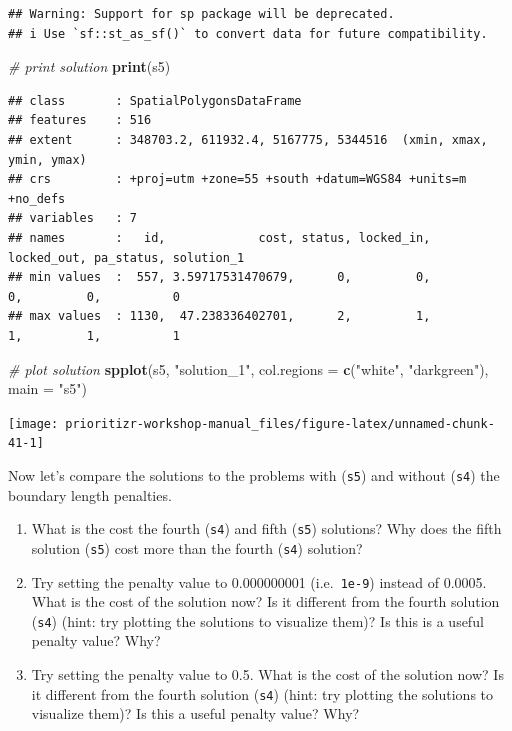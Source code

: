 \documentclass[12pt,]{book}
\makeatletter
\newenvironment{Shaded}{\begin{snugshade}}{\end{snugshade}}
\newcommand{\CommentTok}[1]{\textcolor[rgb]{0.56,0.35,0.01}{\textit{#1}}}
\newcommand{\DataTypeTok}[1]{\textcolor[rgb]{0.13,0.29,0.53}{#1}}
\newcommand{\KeywordTok}[1]{\textcolor[rgb]{0.13,0.29,0.53}{\textbf{#1}}}
\newcommand{\NormalTok}[1]{#1}
\newcommand{\StringTok}[1]{\textcolor[rgb]{0.31,0.60,0.02}{#1}}
\providecommand{\tightlist}{%
  \setlength{\itemsep}{0pt}\setlength{\parskip}{0pt}}
\newenvironment{kframe}{%
\medskip{}
\setlength{\fboxsep}{.8em}
 \def\at@end@of@kframe{}%
 \ifinner\ifhmode%
  \def\at@end@of@kframe{\end{minipage}}%
  \begin{minipage}{\columnwidth}%
 \fi\fi%
 \def\FrameCommand##1{\hskip\@totalleftmargin \hskip-\fboxsep
 \colorbox{shadecolor}{##1}\hskip-\fboxsep
     \hskip-\linewidth \hskip-\@totalleftmargin \hskip\columnwidth}%
 \MakeFramed {\advance\hsize-\width
   \@totalleftmargin\z@ \linewidth\hsize
   \@setminipage}}%
 {\par\unskip\endMakeFramed%
 \at@end@of@kframe}
\newenvironment{rmdblock}[1]
  {
  \begin{itemize}
  \renewcommand{\labelitemi}{
    \raisebox{-.7\height}[0pt][0pt]{
      {\setkeys{Gin}{width=3em,keepaspectratio}\texttt{[image: images/\#1]}}
    }
  }
  \setlength{\fboxsep}{1em}
  \begin{kframe}
  \item
  }
  {
  \end{kframe}
  \end{itemize}
  }
\newenvironment{rmdquestion}
  {\begin{rmdblock}{question}}
  {\end{rmdblock}}
\makeatother
\begin{document}
\begin{verbatim}
## Warning: Support for sp package will be deprecated.
## i Use `sf::st_as_sf()` to convert data for future compatibility.
\end{verbatim}

\begin{Shaded}
\begin{Highlighting}[]
\CommentTok{# print solution}
\KeywordTok{print}\NormalTok{(s5)}
\end{Highlighting}
\end{Shaded}

\begin{verbatim}
## class       : SpatialPolygonsDataFrame 
## features    : 516 
## extent      : 348703.2, 611932.4, 5167775, 5344516  (xmin, xmax, ymin, ymax)
## crs         : +proj=utm +zone=55 +south +datum=WGS84 +units=m +no_defs 
## variables   : 7
## names       :   id,             cost, status, locked_in, locked_out, pa_status, solution_1 
## min values  :  557, 3.59717531470679,      0,         0,          0,         0,          0 
## max values  : 1130,  47.238336402701,      2,         1,          1,         1,          1
\end{verbatim}

\begin{Shaded}
\begin{Highlighting}[]
\CommentTok{# plot solution}
\KeywordTok{spplot}\NormalTok{(s5, }\StringTok{"solution_1"}\NormalTok{, }\DataTypeTok{col.regions =} \KeywordTok{c}\NormalTok{(}\StringTok{"white"}\NormalTok{, }\StringTok{"darkgreen"}\NormalTok{), }\DataTypeTok{main =} \StringTok{"s5"}\NormalTok{)}
\end{Highlighting}
\end{Shaded}

\begin{center}\texttt{[image: prioritizr-workshop-manual\_files/figure-latex/unnamed-chunk-41-1]} \end{center}

Now let's compare the solutions to the problems with (\texttt{s5}) and without (\texttt{s4}) the boundary length penalties.

\begin{rmdquestion}
\begin{enumerate}
\def\labelenumi{\arabic{enumi}.}
\tightlist
\item
  What is the cost the fourth (\texttt{s4}) and fifth (\texttt{s5}) solutions? Why does the fifth solution (\texttt{s5}) cost more than the fourth (\texttt{s4}) solution?
\item
  Try setting the penalty value to 0.000000001 (i.e.~\texttt{1e-9}) instead of 0.0005. What is the cost of the solution now? Is it different from the fourth solution (\texttt{s4}) (hint: try plotting the solutions to visualize them)? Is this is a useful penalty value? Why?
\item
  Try setting the penalty value to 0.5. What is the cost of the solution now? Is it different from the fourth solution (\texttt{s4}) (hint: try plotting the solutions to visualize them)? Is this a useful penalty value? Why?
\end{enumerate}
\end{rmdquestion}
\end{document}

